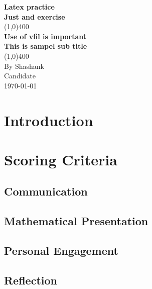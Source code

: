 \documentclass[11pt]{article}
\begin{document}
\begin{titlepage}
\begin{center}
\vspace{1in}
\Large\textbf{Latex practice}\\
\Large\textbf{Just and exercise}\\
\vfil
\line(1,0){400}\\[1mm]
\huge{\textbf{Use of vfil is important}}\\[3mm]
\Large{\textbf{This is sampel sub title}}\\[1mm]
\line(1,0){400}\\
\vfil
By Shashank\\
Candidate \\
\today

\end{center}
\end{titlepage}

\tableofcontents
\thispagestyle{empty}
\clearpage

\setcounter{page}{1}



\section{Introduction}
\section{Scoring Criteria}
\subsection{Communication}
\subsection{Mathematical Presentation}
\subsection{Personal Engagement}
\subsection{Reflection}
\end{document}
